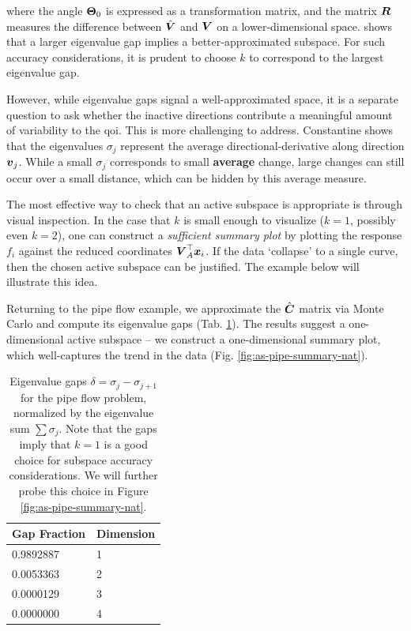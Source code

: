 \documentclass{article}
\begin{document}
\noindent where the angle $\boldsymbol{\Theta}_0$ is expressed as a transformation matrix,
and the matrix $\boldsymbol{R}$ measures the difference between $\hat{\boldsymbol{V}}$ and $\boldsymbol{V}$ on a
lower-dimensional space.  shows that a larger eigenvalue gap
implies a better-approximated subspace. For such accuracy considerations, it is
prudent to choose $k$ to correspond to the largest eigenvalue gap.

However, while eigenvalue gaps signal a well-approximated space, it is a
separate question to ask whether the inactive directions contribute a meaningful
amount of variability to the qoi. This is more challenging to address.
Constantine shows that the eigenvalues $\sigma_j$ represent the average
directional-derivative along direction $\boldsymbol{v}_j$. While a small $\sigma_j$
corresponds to small \textbf{average} change, large changes can still occur over
a small distance, which can be hidden by this average
measure.\cite{constantine2015}

The most effective way to check that an active subspace is appropriate is
through visual inspection. In the case that $k$ is small enough to visualize
($k=1$, possibly even $k=2$), one can construct a \emph{sufficient summary
  plot}\cite{cook2009regression} by plotting the response $f_i$ against the
reduced coordinates $\boldsymbol{V}_{A}^{\top}\boldsymbol{x}_i$. If the data `collapse' to a single
curve, then the chosen active subspace can be justified. The example below will
illustrate this idea.

Returning to the pipe flow example, we approximate the $\hat{\boldsymbol{C}}$ matrix via
Monte Carlo and compute its eigenvalue gaps (Tab. \ref{tab:as-pipe-gaps}). The
results suggest a one-dimensional active subspace -- we construct a
one-dimensional summary plot, which well-captures the trend in the data (Fig.
\ref{fig:as-pipe-summary-nat}).

\begin{table}[!ht]
  \centering
  \begin{tabular}{@{}ll@{}}
    \hline
    Gap Fraction & Dimension\\
    \hline
    0.9892887 & 1\\
    \hline
    0.0053363 & 2\\
    \hline
    0.0000129 & 3\\
    \hline
    0.0000000 & 4\\
    \hline
  \end{tabular}
  \caption{Eigenvalue gaps $\delta = \sigma_j - \sigma_{j+1}$ for the pipe flow
    problem, normalized by the eigenvalue sum $\sum \sigma_j$. Note that the
    gaps imply that $k=1$ is a good choice for subspace accuracy considerations.
    We will further probe this choice in Figure \ref{fig:as-pipe-summary-nat}.}
  \label{tab:as-pipe-gaps}
\end{table}
\end{document}
